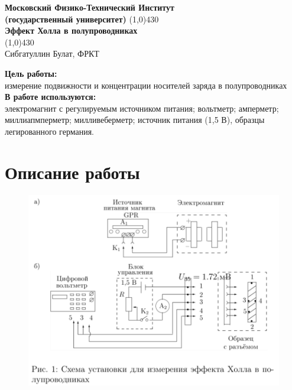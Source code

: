 \documentclass[11pt]{article}
\begin{document}
\begin{titlepage}

\begin{center}
\large\textbf{Московский Физико-Технический Институт}\\
\large\textbf{(государственный университет)}
\vfill
\line(1,0){430}\\[1mm]
\huge\textbf{Эффект Холла в полупроводниках}\\
\line(1,0){430}\\[1mm]
\vfill
\large Сибгатуллин Булат, ФРКТ\\
\end{center}

\end{titlepage}
\noindent \textbf{Цель работы:} \\
\indent измерение подвижности и концентрации носителей заряда в полупроводниках\\
\noindent \textbf{В работе используются:} \\
\indent электромагнит с регулируемым источником питания; вольтметр; амперметр; миллиапмперметр; милливеберметр; источник питания (1,5 В), образцы легированного германия.

\section*{Описание работы}

\begin{figure}[h!]
\centering
\includegraphics[scale=1]{image1.png}
\label{fig:Image1}
\end{figure}
\end{document}
